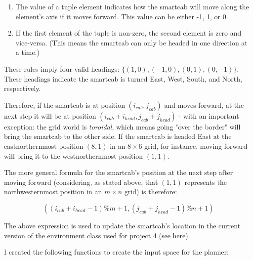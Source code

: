 \documentclass{article}
\begin{document}
\begin{enumerate}
   \item The value of a tuple element indicates how the smartcab will move along the element's axis if it moves forward. This value can be either -1, 1, or 0.
   \item If the first element of the tuple is non-zero, the second element is zero and vice-versa. (This means the smartcab can only be headed in one direction at a time.)
\end{enumerate}

These rules imply four valid headings: $\{(1, 0), (-1, 0), (0, 1), (0, -1)\}$. These headings indicate the smartcab is turned East, West, South, and North, respectively.
 
Therefore, if the smartcab is at position $(i_{cab}, j_{cab})$ and moves forward, at the next step it will be at position $(i_{cab} + i_{head}, j_{cab} + j_{head})$ - with an important exception: the grid world is \textit{toroidal}, which means going "over the border" will bring the smartcab to the other side. If the smartcab is headed East at the eastnorthernmost position $(8, 1)$ in an $8\times6$ grid, for instance, moving forward will bring it to the westnorthernmost position $(1, 1)$. 

The more general formula for the smartcab's position at the next step after moving forward (considering, as stated above, that $(1, 1)$ represents the northwesternmost position in an $m\times n$ grid) is therefore:

\begin{equation}
((i_{cab} + i_{head} - 1) \% m + 1, (j_{cab} + j_{head} - 1) \% n + 1)
\end{equation}

The above expression is used to update the smartcab's location in the current version of the environment class used for project 4 (see \href{https://github.com/udacity/machine-learning/blob/2b6a7fca8ea43e00519f426a6b4ad3a130fca737/projects/smartcab/smartcab/environment.py#L195-L19}{here}).

I created the following functions to create the input space for the planner:
\end{document}
